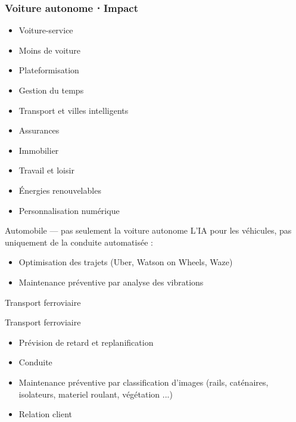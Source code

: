\begin{frame}
  \frametitle{Voiture autonome ⋅ Impact}
  \begin{minipage}{0.49\linewidth}
    \begin{itemize}
      \item Voiture-service
      \item Moins de voiture
      \item Plateformisation
      \item Gestion du temps
      \item Transport et villes intelligents
    \end{itemize}
  \end{minipage}
  \begin{minipage}{0.49\linewidth}
    \begin{itemize}
      \item Assurances
      \item Immobilier
      \item Travail et loisir
      \item Énergies renouvelables
      \item Personnalisation numérique
    \end{itemize}
  \end{minipage}
\end{frame}

\begin{frame}{Automobile --- pas seulement la voiture autonome}
  L'IA pour les véhicules, pas uniquement de la conduite automatisée :
  \begin{itemize}
  \item Optimisation des trajets (Uber, Watson on Wheels, Waze)
  \item Maintenance préventive par analyse des vibrations
  \end{itemize}
\end{frame}

\begin{frame}{Transport ferroviaire}
\end{frame}

\begin{frame}{Transport ferroviaire}
  \begin{itemize}
  \item Prévision de retard et replanification
  \item Conduite
  \item Maintenance préventive par classification d'images (rails, caténaires, isolateurs, materiel roulant, végétation ...)
  \item Relation client
  \end{itemize}
\end{frame}

